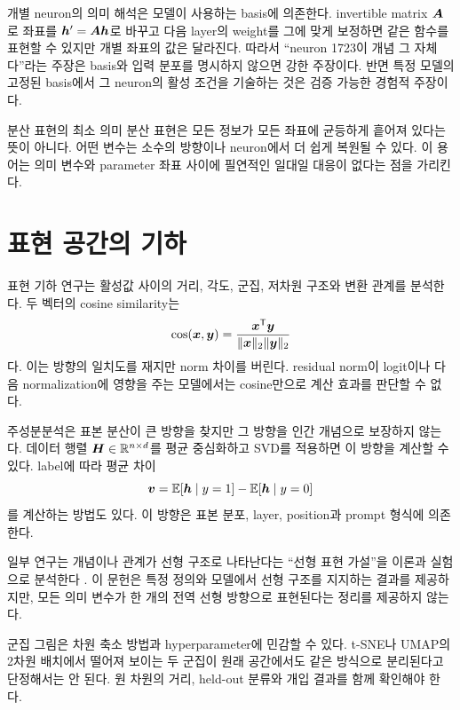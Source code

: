 개별 neuron의 의미 해석은 모델이 사용하는 basis에 의존한다.
invertible matrix $\bm{A}$로 좌표를 $\bm{h}'=\bm{A}\bm{h}$로 바꾸고 다음 layer의 weight를 그에 맞게 보정하면 같은 함수를 표현할 수 있지만 개별 좌표의 값은 달라진다.
따라서 ``neuron 1723이 개념 그 자체다''라는 주장은 basis와 입력 분포를 명시하지 않으면 강한 주장이다.
반면 특정 모델의 고정된 basis에서 그 neuron의 활성 조건을 기술하는 것은 검증 가능한 경험적 주장이다.

\begin{interpretbox}{분산 표현의 최소 의미}
분산 표현은 모든 정보가 모든 좌표에 균등하게 흩어져 있다는 뜻이 아니다.
어떤 변수는 소수의 방향이나 neuron에서 더 쉽게 복원될 수 있다.
이 용어는 의미 변수와 parameter 좌표 사이에 필연적인 일대일 대응이 없다는 점을 가리킨다.
\end{interpretbox}

\section{표현 공간의 기하}

표현 기하 연구는 활성값 사이의 거리, 각도, 군집, 저차원 구조와 변환 관계를 분석한다.
두 벡터의 cosine similarity는
\begin{equation}
  \cos(\bm{x},\bm{y})=
  \frac{\bm{x}^{\mathsf T}\bm{y}}{\lVert\bm{x}\rVert_2
  \lVert\bm{y}\rVert_2}
\end{equation}
다.
이는 방향의 일치도를 재지만 norm 차이를 버린다.
residual norm이 logit이나 다음 normalization에 영향을 주는 모델에서는 cosine만으로 계산 효과를 판단할 수 없다.

주성분분석은 표본 분산이 큰 방향을 찾지만 그 방향을 인간 개념으로 보장하지 않는다.
데이터 행렬 $\bm{H}\in\mathbb{R}^{n\times d}$를 평균 중심화하고 SVD를 적용하면 이 방향을 계산할 수 있다.
label에 따라 평균 차이
\begin{equation}
  \bm{v}=\mathbb{E}[\bm{h}\mid y=1]-\mathbb{E}[\bm{h}\mid y=0]
\end{equation}
를 계산하는 방법도 있다.
이 방향은 표본 분포, layer, position과 prompt 형식에 의존한다.

일부 연구는 개념이나 관계가 선형 구조로 나타난다는 ``선형 표현 가설''을 이론과 실험으로 분석한다 \citep{park2024linear}.
이 문헌은 특정 정의와 모델에서 선형 구조를 지지하는 결과를 제공하지만, 모든 의미 변수가 한 개의 전역 선형 방향으로 표현된다는 정리를 제공하지 않는다.

\begin{limitbox}
군집 그림은 차원 축소 방법과 hyperparameter에 민감할 수 있다.
t-SNE나 UMAP의 2차원 배치에서 떨어져 보이는 두 군집이 원래 공간에서도 같은 방식으로 분리된다고 단정해서는 안 된다.
원 차원의 거리, held-out 분류와 개입 결과를 함께 확인해야 한다.
\end{limitbox}

